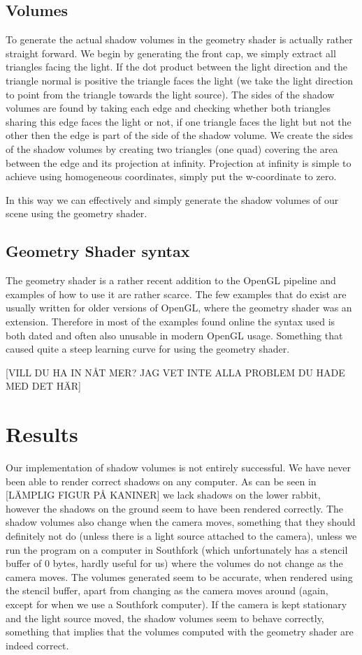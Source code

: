 \documentclass[a4paper, 12pt]{article}
\begin{document}
\subsection{Volumes}
To generate the actual shadow volumes in the geometry shader is actually rather
straight forward. We begin by generating the front cap, we simply extract all
triangles facing the light. If the dot product between the light direction and
the triangle normal is positive the triangle faces the light (we take the light
direction to point from the triangle towards the light source). The sides of the
shadow volumes are found by taking each edge and checking whether both triangles
sharing this edge faces the light or not, if one triangle faces the light but
not the other then the edge is part of the side of the shadow volume. We create
the sides of the shadow volumes by creating two triangles (one quad) covering
the area between the edge and its projection at infinity. Projection at infinity
is simple to achieve using homogeneous coordinates, simply put the w-coordinate
to zero.

In this way we can effectively and simply generate the shadow volumes of our
scene using the geometry shader.

\subsection{Geometry Shader syntax}
The geometry shader is a rather recent addition to the OpenGL pipeline and
examples of how to use it are rather scarce. The few examples that do exist are
usually written for older versions of OpenGL, where the geometry shader was an
extension. Therefore in most of the examples found online the syntax used is
both dated and often also unusable in modern OpenGL usage. Something that caused
quite a steep learning curve for using the geometry shader.

[VILL DU HA IN NÅT MER? JAG VET INTE ALLA PROBLEM DU HADE MED DET HÄR]

\section{Results}
Our implementation of shadow volumes is not entirely successful. We have never
been able to render correct shadows on any computer. As can be seen in [LÄMPLIG
FIGUR PÅ KANINER] we lack shadows on the lower rabbit, however the shadows on
the ground seem to have been rendered correctly. The shadow volumes also change
when the camera moves, something that they should definitely not do (unless
there is a light source attached to the camera), unless we run the program on
a computer in Southfork (which unfortunately has a stencil buffer of 0 bytes,
hardly useful for us) where the volumes do not change as the camera moves. The
volumes generated seem to be accurate, when rendered using the stencil buffer,
apart from changing as the camera moves around (again, except for when we use a
Southfork computer). If the camera is kept stationary and the light source
moved, the shadow volumes seem to behave correctly, something that implies that
the volumes computed with the geometry shader are indeed correct.
\end{document}

